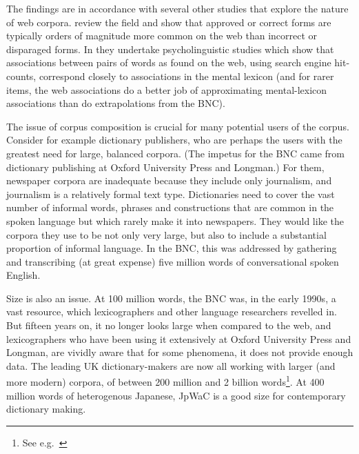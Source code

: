 \documentclass[english]{jnlp_1.4}
\newcommand{\url}[1]{}
\begin{document}
\begin{table}[t]
\begin{center}

\label{tab3}
\end{center}
\end{table}

The findings are in accordance with several other studies that explore
the nature of web corpora.  review the field and
show that approved or correct forms are typically orders of magnitude
more common on the web than incorrect or disparaged forms. In  
they undertake psycholinguistic studies which show that
associations between pairs of words as found on the web, using search
engine hit-counts, correspond closely to associations in the mental
lexicon (and for rarer items, the web associations do a better job of
approximating mental-lexicon associations than do extrapolations from
the BNC). 


The issue of corpus composition is crucial for many potential
users of the corpus. Consider for example dictionary publishers, who
are perhaps the users with the greatest need for large, balanced
corpora. (The impetus for the BNC came from dictionary publishing at
Oxford University Press and Longman.)  For them, newspaper corpora are
inadequate because they include only journalism, and journalism is a
relatively formal text type. Dictionaries need to cover the vast
number of informal words, phrases and constructions that are common in
the spoken language but which rarely make it into newspapers. They
would like the corpora they use to be not only very large, but also to
include a substantial proportion of informal language. In the BNC,
this was addressed by gathering and transcribing (at great expense)
five million words of conversational spoken English.

Size is also an issue. At 100 million words, the BNC was, in the early
1990s, a vast resource, which lexicographers and other language
researchers revelled in. But fifteen years on, it no longer looks
large when compared to the web, and lexicographers who have been using
it extensively at Oxford University Press and Longman, are vividly
aware that for some phenomena, it does not provide enough data. The
leading UK dictionary-makers are now all working with larger (and more
modern) corpora, of between 200 million and 2 billion
words\footnote{
	See e.g.\ \url{http://www.askoxford.com/oec}
}. At 400
million words of heterogenous Japanese, JpWaC is a good size for
contemporary dictionary making.
\end{document}
